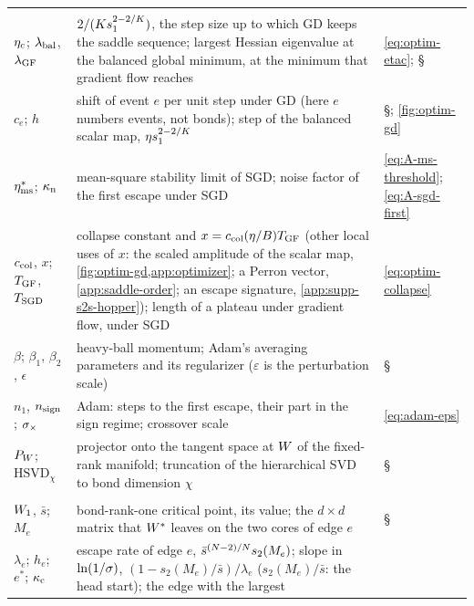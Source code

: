 \begin{xltabular}{\textwidth}{@{}>{\raggedright\arraybackslash}p{3.1cm}X
    >{\raggedright\arraybackslash}p{2.5cm}@{}}
  \midrule
   \\
  $\eta_c$; $\lambda_{\rm bal}$, $\lambda_{\rm GF}$ & $2/(Ks_{1}^{2-2/K})$, the step size up to which GD keeps
    the saddle sequence; largest Hessian eigenvalue at the balanced global minimum, at the minimum that
    gradient flow reaches & \eqref{eq:optim-etac}; \S{} \\
  $c_e$; $h$ & shift of event $e$ per unit step under GD (here $e$ numbers events, not bonds); step of the
    balanced scalar map,
    $\eta s_{1}^{2-2/K}$ & \S{}; \cref{fig:optim-gd} \\
  $\eta^*_{\rm ms}$; $\kappa_{\rm n}$ & mean-square stability limit of SGD; noise factor of the first escape
    under SGD & \eqref{eq:A-ms-threshold}; \eqref{eq:A-sgd-first} \\
  $c_{\rm col}$, $x$; $T_{\rm GF}$, $T_{\rm SGD}$ & collapse constant and $x=c_{\rm col}(\eta/B)T_{\rm GF}$ (other
    local uses of $x$: the scaled amplitude of the scalar map, \cref{fig:optim-gd,app:optimizer}; a Perron vector,
    \cref{app:saddle-order}; an escape signature, \cref{app:supp-s2s-hopper}); length of a plateau under
    gradient flow, under SGD
    & \eqref{eq:optim-collapse} \\
  $\beta$; $\beta_1$, $\beta_2$, $\epsilon$ & heavy-ball momentum; Adam's averaging parameters and its
    regularizer ($\varepsilon$ is the perturbation scale) & \S{} \\
  $n_1$, $n_{\rm sign}$; $\sigma_\times$ & Adam: steps to the first escape, their part in the sign regime;
    crossover scale & \eqref{eq:adam-eps} \\
  $P_{W}$; $\mathrm{HSVD}_\chi$ & projector onto the tangent space at $W$ of the fixed-rank manifold;
    truncation of the hierarchical SVD to bond dimension $\chi$ & \S{} \\
  \midrule
   \\
  $W_1$, $\bar s$; $M_e$ & bond-rank-one critical point, its value; the $d\times d$ matrix that $W^{*}$
    leaves on the two cores of edge $e$ & \S{} \\
  $\lambda_e$; $h_e$; $e^*$; $\kappa_{\rm c}$ & escape rate of edge $e$, $\bar s^{(N-2)/N}s_2(M_e)$; slope in
    $\ln(1/\sigma)$, $(1-s_2(M_e)/\bar s)/\lambda_e$ ($s_2(M_e)/\bar s$: the head start); the edge with the largest

\end{xltabular}
